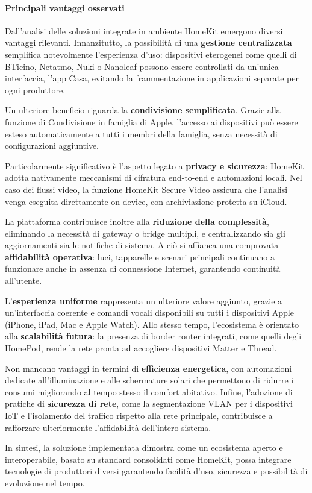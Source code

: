 \paragraph{Principali vantaggi osservati}

Dall’analisi delle soluzioni integrate in ambiente HomeKit emergono diversi vantaggi rilevanti. Innanzitutto, la possibilità di una \textbf{gestione centralizzata} semplifica notevolmente l’esperienza d’uso: dispositivi eterogenei come quelli di BTicino, Netatmo, Nuki o Nanoleaf possono essere controllati da un’unica interfaccia, l’app Casa, evitando la frammentazione in applicazioni separate per ogni produttore.  

Un ulteriore beneficio riguarda la \textbf{condivisione semplificata}. Grazie alla funzione di Condivisione in famiglia di Apple, l’accesso ai dispositivi può essere esteso automaticamente a tutti i membri della famiglia, senza necessità di configurazioni aggiuntive.  

Particolarmente significativo è l’aspetto legato a \textbf{privacy e sicurezza}: HomeKit adotta nativamente meccanismi di cifratura end-to-end e automazioni locali. Nel caso dei flussi video, la funzione HomeKit Secure Video assicura che l’analisi venga eseguita direttamente on-device, con archiviazione protetta su iCloud.  

La piattaforma contribuisce inoltre alla \textbf{riduzione della complessità}, eliminando la necessità di gateway o bridge multipli, e centralizzando sia gli aggiornamenti sia le notifiche di sistema. A ciò si affianca una comprovata \textbf{affidabilità operativa}: luci, tapparelle e scenari principali continuano a funzionare anche in assenza di connessione Internet, garantendo continuità all’utente.  

L’\textbf{esperienza uniforme} rappresenta un ulteriore valore aggiunto, grazie a un’interfaccia coerente e comandi vocali disponibili su tutti i dispositivi Apple (iPhone, iPad, Mac e Apple Watch). Allo stesso tempo, l’ecosistema è orientato alla \textbf{scalabilità futura}: la presenza di border router integrati, come quelli degli HomePod, rende la rete pronta ad accogliere dispositivi Matter e Thread.  

Non mancano vantaggi in termini di \textbf{efficienza energetica}, con automazioni dedicate all’illuminazione e alle schermature solari che permettono di ridurre i consumi migliorando al tempo stesso il comfort abitativo. Infine, l’adozione di pratiche di \textbf{sicurezza di rete}, come la segmentazione VLAN per i dispositivi IoT e l’isolamento del traffico rispetto alla rete principale, contribuisce a rafforzare ulteriormente l’affidabilità dell’intero sistema.


\noindent In sintesi, la soluzione implementata dimostra come un ecosistema aperto e interoperabile, basato su standard consolidati come HomeKit, possa integrare tecnologie di produttori diversi garantendo facilità d'uso, sicurezza e possibilità di evoluzione nel tempo.